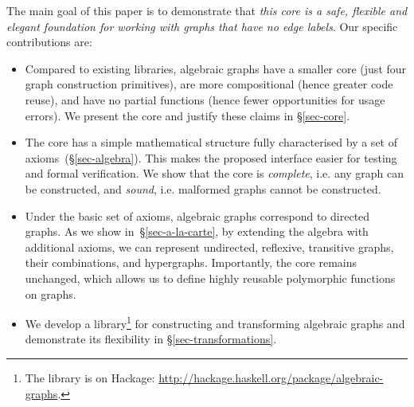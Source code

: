 The main goal of this paper is to demonstrate that \emph{this core is a safe, flexible
and elegant foundation for working with graphs that have no edge labels}. Our specific
contributions are:
\vspace{-0.25mm}
\begin{itemize}
  \item Compared to existing libraries, algebraic graphs have a smaller
  core (just four graph construction primitives), are more compositional
  (hence greater code reuse), and have no partial functions (hence fewer
  opportunities for usage errors). We present the core and justify these claims
  in \S\ref{sec-core}.

  \item The core has a simple mathematical structure fully characterised
  by a set of axioms~(\S\ref{sec-algebra}). This makes the
  proposed interface easier for testing and formal verification. We show that
  the core is \emph{complete}, i.e. any graph can be constructed, and \emph{sound},
  i.e. malformed graphs cannot be constructed.

  \item Under the basic set of axioms, algebraic graphs correspond to directed
  graphs. As we show in~\S\ref{sec-a-la-carte}, by extending
  the algebra with additional axioms, we can represent undirected,
  reflexive, transitive graphs, their combinations, and hypergraphs.
  Importantly, the core remains unchanged, which allows us to define highly
  reusable polymorphic functions on graphs.

  \item We develop a library\footnote{The library is on Hackage:
  \url{http://hackage.haskell.org/package/algebraic-graphs}.}
  for constructing and transforming algebraic graphs
  and demonstrate its flexibility in \S\ref{sec-transformations}.

\end{itemize}

